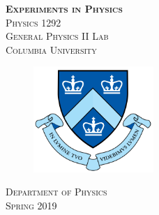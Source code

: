 \begin{titlepage}
\begin{center}
\textsc{\Huge\bf Experiments in Physics}
\\[5cm]
\textsc{\huge Physics 1292}
\\[0.3cm]
\textsc{\huge General Physics II Lab}
\\[4cm]
\textsc{\large Columbia University}
\\[0.5cm]
\begin{figure}[h]
  \centering
  \includegraphics[height=4cm]{./pic/Columbia-Logo.png}
\end{figure}
\textsc{Department of Physics}
\\[1cm]
\textsc{Spring 2019}
\end{center}
\end{titlepage}
